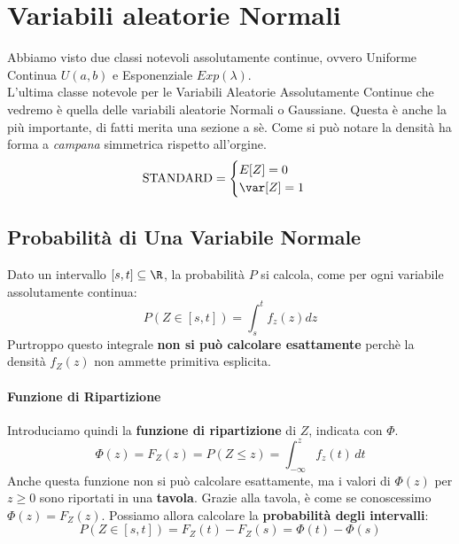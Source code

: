 
\pagebreak
\section{Variabili aleatorie Normali}
Abbiamo visto due classi notevoli assolutamente continue, ovvero Uniforme Continua $U(a,b)$
e Esponenziale $Exp(\lambda)$.
\\L'ultima classe notevole per le Variabili Aleatorie Assolutamente Continue che vedremo
è quella delle variabili aleatorie Normali o Gaussiane. Questa è anche la più importante, di fatti merita una sezione a sè.
Come si può notare la densità ha forma a \emph{campana} simmetrica rispetto all'orgine.
\[
	\text{STANDARD} =
	\begin{cases}
		E[Z] = 0 \\
		\var[Z] = 1
	\end{cases}
\]
\subsection{Probabilità di Una Variabile Normale}
Dato un intervallo $[s,t] \subseteq \R$, la probabilità $P$ si calcola,
come per ogni variabile assolutamente continua:
\[
	P(Z\in [s,t]) = \int_{s}^{t} f_z(z) dz
\]
Purtroppo questo integrale \textbf{non si può calcolare esattamente} perchè
la densità $f_Z(z)$ non ammette primitiva esplicita.
\paragraph{Funzione di Ripartizione}
Introduciamo quindi la \textbf{funzione di ripartizione} di $Z$, indicata con $\Phi$.
\[
	\Phi(z) = F_Z(z) = P(Z \leq z) = \int_{-\infty}^{z}f_z(t)\,dt
\]
Anche questa funzione non si può calcolare esattamente, ma i valori di $\Phi(z)$ per
$z \geq 0$ sono riportati in una \textbf{tavola}.
Grazie alla tavola, è come se conoscessimo $\Phi(z) = F_Z(z)$.
Possiamo allora calcolare la \textbf{probabilità degli intervalli}:
\[
	P(Z\in [s,t]) = F_Z(t) - F_Z(s) = \Phi(t) - \Phi(s)
\]

